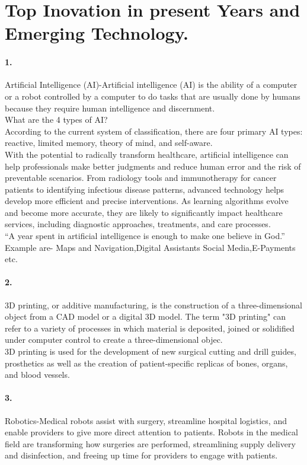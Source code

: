 \documentclass[12pt]{report}
\begin{document}
\section{Top Inovation in present Years and Emerging Technology.}\paragraph{1.}
Artificial Intelligence (AI)-Artificial intelligence (AI) is the ability of a computer or a robot controlled by a computer to do tasks that are usually done by humans because they require human intelligence and discernment.\\
What are the 4 types of AI?\\
According to the current system of classification, there are four primary AI types: reactive, limited memory, theory of mind, and self-aware.\\
With the potential to radically transform healthcare, artificial intelligence can help professionals make better judgments and reduce human error and the risk of preventable scenarios. From radiology tools and immunotherapy for cancer patients to identifying infectious disease patterns, advanced technology helps develop more efficient and precise interventions. As learning algorithms evolve and become more accurate, they are likely to significantly impact healthcare services, including diagnostic approaches, treatments, and care processes.  \\
“A year spent in artificial intelligence is enough to make one believe in God.”\\
Example are-  Maps and Navigation,Digital Assistants Social Media,E-Payments etc.\paragraph{2.}
3D printing, or additive manufacturing, is the construction of a three-dimensional object from a CAD model or a digital 3D model. The term "3D printing" can refer to a variety of processes in which material is deposited, joined or solidified under computer control to create a three-dimensional objec.\\3D printing is used for the development of new surgical cutting and drill guides, prosthetics as well as the creation of patient-specific replicas of bones, organs, and blood vessels.\paragraph{3.}
Robotics-Medical robots assist with surgery, streamline hospital logistics, and enable providers to give more direct attention to patients. Robots in the medical field are transforming how surgeries are performed, streamlining supply delivery and disinfection, and freeing up time for providers to engage with patients.\\
\end{document}
